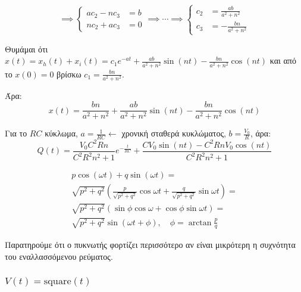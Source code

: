 \documentclass[11pt,a4paper,titlepage,draft]{article}
\begin{document}
\[
\implies
\begin{cases}
ac_2-nc_3&=b \\
nc_2+ac_3&=0 
\end{cases}
\implies \cdots \implies
\begin{cases}
c_2 &= \frac{ab}{a^2+n^2} \\
c_3 &= -\frac{bn}{a^2+n^2} 
\end{cases}
\]

Θυμάμαι ότι \(x(t) = x_h(t)+x_i(t) = c_1e^{-at} + \frac{ab}{a^2+n^2} \sin (nt) -  \frac{bn}{a^2+n^2} \cos (nt)\) και από το \(x(0)=0\) βρίσκω \(c_1 = \frac{bn}{a^2+n^2}\).

Άρα:
\[
x(t) = \frac{bn}{a^2+n^2} + \frac{ab}{a^2+n^2} \sin (nt) -  \frac{bn}{a^2+n^2} \cos (nt)
\]

Για το \(RC\) κύκλωμα, \(a=\frac{1}{RC} \leftarrow \) χρονική σταθερά κυκλώματος, \(b=\frac{V_0}{R}\), άρα:
\[
Q(t) = \frac{V_0C^2Rn}{C^2R^2n^2+1}e^{-\frac{t}{RC}} + \frac{CV_0\sin (nt) - C^2RnV_0 \cos (nt)}{C^2R^2n^2+1}
\]

\begin{attnbox}{}
\begin{align*}
p \cos (\omega t) + q \sin (\omega t) = \\
\sqrt{p^2+q^2} \left( \frac{p}{\sqrt{p^2+q^2}} \cos \omega t+ \frac{q}{\sqrt{p^2+q^2}} \sin \omega t \right) = \\
\sqrt{p^2+q^2} \left ( \sin \phi \cos \omega + \cos \phi \sin \omega t \right) = \\
\sqrt{p^2+q^2} \sin ( \omega t + \phi ), \quad \phi = \arctan \frac{p}{q}
\end{align*}
\end{attnbox}

Παρατηρούμε ότι ο πυκνωτής φορτίζει περισσότερο αν είναι μικρότερη η συχνότητα του εναλλασσόμενου ρεύματος.

\pgfplotsset{width=0.8\textwidth}

\subsubsection{\(V(t) = \mathrm{square}(t)\)}
\end{document}
